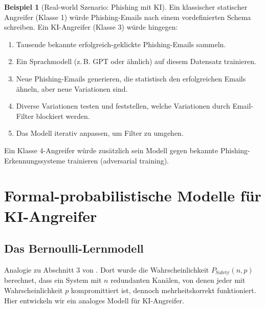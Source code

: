 \documentclass[a4paper,12pt]{article}
\theoremstyle{definition}
\newtheorem{beispiel}{Beispiel}
\begin{document}
\begin{beispiel}[Real-world Szenario: Phishing mit KI]
Ein klassischer statischer Angreifer (Klasse 1) würde Phishing-Emails nach einem vordefinierten Schema schreiben. Ein KI-Angreifer (Klasse 3) würde hingegen:
\begin{enumerate}
	\item Tausende bekannte erfolgreich-geklickte Phishing-Emails sammeln.
	\item Ein Sprachmodell (z.\,B. GPT oder ähnlich) auf diesem Datensatz trainieren.
	\item Neue Phishing-Emails generieren, die statistisch den erfolgreichen Emails ähneln, aber neue Variationen sind.
	\item Diverse Variationen testen und feststellen, welche Variationen durch Email-Filter blockiert werden.
	\item Das Modell iterativ anpassen, um Filter zu umgehen.
\end{enumerate}

Ein Klasse 4-Angreifer würde zusätzlich sein Modell gegen bekannte Phishing-Erkennungssysteme trainieren (adversarial training).
\end{beispiel}

\section{Formal-probabilistische Modelle für KI-Angreifer}

\subsection{Das Bernoulli-Lernmodell}

Analogie zu Abschnitt 3 von \cite{Epp26a}. Dort wurde die Wahrscheinlichkeit $P_{\mathrm{Safety}}(n,p)$ berechnet, dass ein System mit $n$ redundanten Kanälen, von denen jeder mit Wahrscheinlichkeit $p$ kompromittiert ist, dennoch mehrheitskorrekt funktioniert. Hier entwickeln wir ein analoges Modell für KI-Angreifer.
\end{document}
